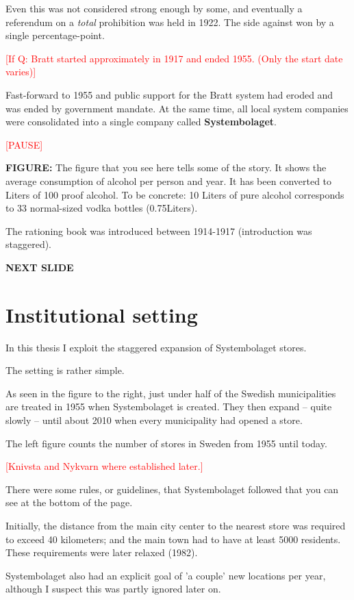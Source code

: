 \documentclass[12pt]{article}
\newcommand{\TODO}[1]{\textcolor{red}{[#1]}}
\begin{document}
Even this was not considered strong enough by some, and eventually a referendum on a \emph{total}  prohibition was held in 1922. The side against won by a single percentage-point.

\TODO{If Q: Bratt started approximately in 1917 and ended 1955. (Only the start date varies)}

Fast-forward to 1955 and public support for the Bratt system had eroded and was ended by government mandate. At the same time, all local system companies were consolidated into a single company called  \textbf{Systembolaget}.

\TODO{PAUSE}

 \textbf{FIGURE:} The figure that you see here tells some of the story. It shows the average consumption of alcohol per person and year. It has been converted to Liters of 100 proof alcohol. To be concrete: 10 Liters of pure alcohol corresponds to 33 normal-sized vodka bottles (0.75Liters).

The rationing book was introduced between 1914-1917 (introduction was staggered).

\textbf{NEXT SLIDE}

\section{Institutional setting}

In this thesis I exploit the staggered expansion of Systembolaget stores. 
 
The setting is rather simple. 

 As seen in the figure to the right, just under half of the Swedish municipalities are treated in 1955 when Systembolaget is created. They then expand -- quite slowly -- until about 2010 when every municipality had opened a store. 
 
 The left figure counts the number of stores in Sweden from 1955 until today.

 \TODO{Knivsta and Nykvarn where established later.}

 There were some rules, or guidelines, that Systembolaget followed that you can see at the bottom of the page.

 Initially, the distance from the main city center to the nearest store was required to exceed 40 kilometers; and the main town had to have at least 5000 residents. These requirements were later relaxed (1982).

 Systembolaget also had an explicit goal of 'a couple' new locations per year, although I suspect this was partly ignored later on.
 
\end{document}
